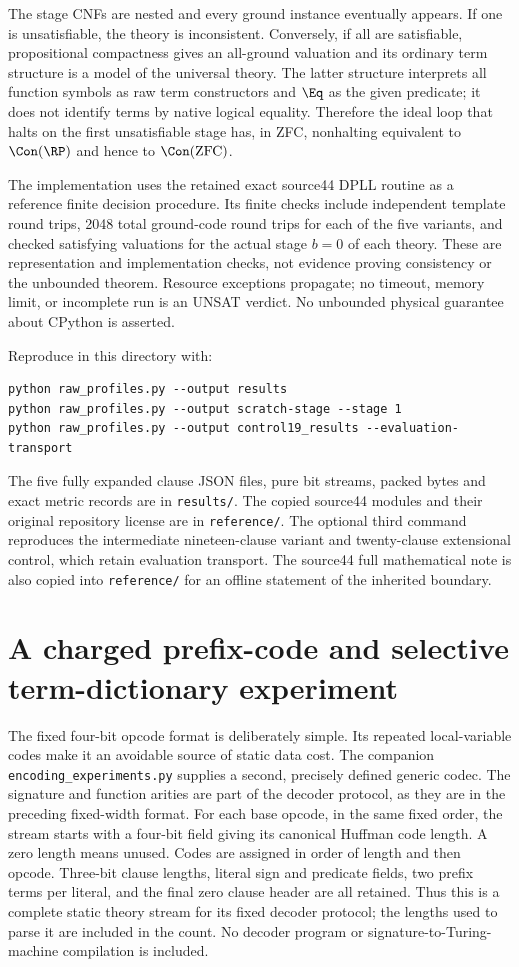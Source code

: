 The stage CNFs are nested and every ground instance eventually appears.
If one is unsatisfiable, the theory is inconsistent. Conversely, if
all are satisfiable, propositional compactness gives an all-ground
valuation and its ordinary term structure is a model of the universal
theory. The latter structure interprets all function symbols as raw
term constructors and $\Eq$ as the given predicate; it does not identify
terms by native logical equality. Therefore the ideal loop that halts
on the first unsatisfiable stage has, in ZFC, nonhalting equivalent to
$\Con(\RP)$ and hence to $\Con(\mathrm{ZFC})$.

The implementation uses the retained exact source44 DPLL routine as a
reference finite decision procedure. Its finite checks include independent
template round trips, 2048 total ground-code round trips for each of the
five variants, and checked satisfying valuations for the actual stage
$b=0$ of each theory. These are representation and implementation checks,
not evidence proving consistency or the unbounded theorem. Resource
exceptions propagate; no timeout, memory limit, or incomplete run is an
UNSAT verdict. No unbounded physical guarantee about CPython is asserted.

Reproduce in this directory with:
\begin{verbatim}
python raw_profiles.py --output results
python raw_profiles.py --output scratch-stage --stage 1
python raw_profiles.py --output control19_results --evaluation-transport
\end{verbatim}
The five fully expanded clause JSON files, pure bit streams, packed bytes
and exact metric records are in \texttt{results/}. The copied source44
modules and their original repository license are in \texttt{reference/}.
The optional third command reproduces the intermediate nineteen-clause
variant and twenty-clause extensional control, which retain evaluation
transport. The source44 full mathematical note is also copied into
\texttt{reference/} for an offline statement of the inherited boundary.

\section{A charged prefix-code and selective term-dictionary experiment}

The fixed four-bit opcode format is deliberately simple. Its repeated
local-variable codes make it an avoidable source of static data cost.
The companion \texttt{encoding\_experiments.py} supplies a second,
precisely defined generic codec. The signature and function arities are
part of the decoder protocol, as they are in the preceding fixed-width
format. For each base opcode, in the same fixed order, the stream starts
with a four-bit field giving its canonical Huffman code length. A zero
length means unused. Codes are assigned in order of length and then
opcode. Three-bit clause lengths, literal sign and predicate fields,
two prefix terms per literal, and the final zero clause header are all
retained. Thus this is a complete static theory stream for its fixed
decoder protocol; the lengths used to parse it are included in the count.
No decoder program or signature-to-Turing-machine compilation is included.

